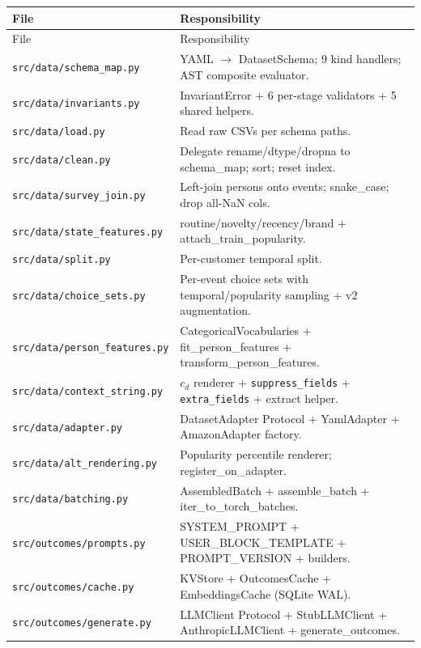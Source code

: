 \documentclass[11pt,a4paper]{article}
\begin{document}
\begin{center}
\small
\begin{longtable}{@{}l p{}@{}}
\toprule
File & Responsibility \\
\midrule
\endfirsthead
\toprule
File & Responsibility \\
\midrule
\endhead
\bottomrule
\endfoot
\texttt{src/data/schema\_map.py}           & YAML $\to$ DatasetSchema; 9 kind handlers; AST composite evaluator. \\
\texttt{src/data/invariants.py}            & InvariantError + 6 per-stage validators + 5 shared helpers. \\
\texttt{src/data/load.py}                  & Read raw CSVs per schema paths. \\
\texttt{src/data/clean.py}                 & Delegate rename/dtype/dropna to schema\_map; sort; reset index. \\
\texttt{src/data/survey\_join.py}          & Left-join persons onto events; snake\_case; drop all-NaN cols. \\
\texttt{src/data/state\_features.py}       & routine/novelty/recency/brand + attach\_train\_popularity. \\
\texttt{src/data/split.py}                 & Per-customer temporal split. \\
\texttt{src/data/choice\_sets.py}          & Per-event choice sets with temporal/popularity sampling + v2 augmentation. \\
\texttt{src/data/person\_features.py}      & CategoricalVocabularies + fit\_person\_features + transform\_person\_features. \\
\texttt{src/data/context\_string.py}       & $c_d$ renderer + \texttt{suppress\_fields} + \texttt{extra\_fields} + extract helper. \\
\texttt{src/data/adapter.py}               & DatasetAdapter Protocol + YamlAdapter + AmazonAdapter factory. \\
\texttt{src/data/alt\_rendering.py}        & Popularity percentile renderer; register\_on\_adapter. \\
\texttt{src/data/batching.py}              & AssembledBatch + assemble\_batch + iter\_to\_torch\_batches. \\
\texttt{src/outcomes/prompts.py}           & SYSTEM\_PROMPT + USER\_BLOCK\_TEMPLATE + PROMPT\_VERSION + builders. \\
\texttt{src/outcomes/cache.py}             & KVStore + OutcomesCache + EmbeddingsCache (SQLite WAL). \\
\texttt{src/outcomes/generate.py}          & LLMClient Protocol + StubLLMClient + AnthropicLLMClient + generate\_outcomes. \\

\end{longtable}
\end{center}
\end{document}
